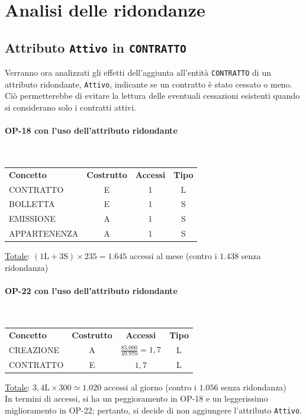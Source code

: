 \documentclass[a4paper,12pt]{report}
\begin{document}
\section{Analisi delle ridondanze}
\subsection{Attributo \texttt{Attivo} in \texttt{CONTRATTO}}
Verranno ora analizzati gli effetti dell'aggiunta all'entità \texttt{CONTRATTO} di un attributo ridondante, \texttt{Attivo}, indicante se un contratto è stato cessato o meno. Ciò permetterebbe di evitare la lettura delle eventuali cessazioni esistenti quando si considerano solo i contratti attivi.
\paragraph{OP-18 con l'uso dell'attributo ridondante}\mbox{}\\
\begin{center}
\begin{tabular}{@{}l c  c  c@{}}
    \hline
    \textbf{Concetto} & \textbf{Costrutto} & \textbf{Accessi} & \textbf{Tipo} \\ [0.5ex]
    CONTRATTO & E & 1 & L \\
    BOLLETTA & E & 1 & S \\
    EMISSIONE & A & 1 & S \\
    APPARTENENZA & A & 1 & S \\
    \hline
\end{tabular}
\end{center}
\underline{Totale}: $(1\text{L} + 3\text{S}) \times 235 = 1.645$ accessi al mese (contro i $1.438$ senza ridondanza)
\paragraph{OP-22 con l'uso dell'attributo ridondante}\mbox{}\\
\begin{center}
\begin{tabular}{@{}l c  c  c@{}}
    \hline
    \textbf{Concetto} & \textbf{Costrutto} & \textbf{Accessi} & \textbf{Tipo} \\ [0.5ex]
    CREAZIONE & A & $\frac{85.000}{49.970} = 1,7$ & L \\
    CONTRATTO & E & $1,7$ & L \\
    \hline
\end{tabular}
\end{center}
\underline{Totale}: $3,4\text{L} \times 300 \simeq 1.020$ accessi al giorno (contro i $1.056$ senza ridondanza)
\\[10pt]
In termini di accessi, si ha un peggioramento in OP-18 e un leggerissimo miglioramento in OP-22; pertanto, si decide di non aggiungere l'attributo \texttt{Attivo}.
\end{document}
